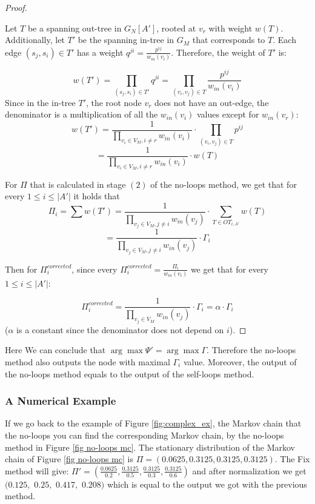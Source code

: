 \documentclass[sigconf,anonymous]{aamas}
\begin{document}
\begin{proof}
\begin{figure}[hbpt]
    \label{fig: no loop in-tree out-tree}
\end{figure}




Let $T$ be a spanning out-tree in $G_N[A']$, rooted at $v_r$ with weight $w(T)$. %
Additionally, let $T'$ be the spanning in-tree in $G_M$ that corresponds to $T$.
Each edge $(s_j,s_i) \in T'$ has a weight $q^{ji} = \frac{p^{ij}}{w_{in}(v_i)}$. 
Therefore, the weight of $T'$ is:

\[
w(T') = \prod _{(s_j,s_i)\in T'} q^{ji}
=\prod _{(v_i,v_j)\in T} \frac{p^{ij}}{w_{in}(v_i)} 
\]
Since in the in-tree $T'$, the root node $v_r$ does not have an out-edge, the denominator is a multiplication of all the $w_{in}(v_i)$ values except for $w_{in}(v_r)$:
\[
w(T') =\frac{1}{\prod _{v_i\in V_M , i\neq r} w_{in}(v_i)} \cdot \prod _{(v_i,v_j)\in T} p^{ij}
\]
\[
=\frac{1}{\prod _{v_i\in V_M , i\neq r} w_{in}(v_i)} \cdot w(T)
\]

For $\Pi$ that is calculated in stage $(2)$ of the no-loops method, we get that for every $1\leq i\leq |A'|$ it holds that \[
\Pi_i = \sum w(T') = \frac{1}{\prod _{v_j\in V_M , j\neq i} w_{in}(v_j)} \cdot \sum_{T\in OT_{i,A'}}w(T)
\]
\[
= \frac{1}{\prod _{v_j\in V_M , j\neq i} w_{in}(v_j)} \cdot \Gamma_i
\]

Then for $\Pi^{corrected}_i$, since every $\Pi^{corrected}_i = \frac{\Pi_i}{w_{in}(v_i)}$ we get that
for every $1\leq i \leq |A'|$: 

\[
\Pi^{corrected}_i= \frac{1}{\prod _{v_j\in V_M } w_{in}(v_j)} \cdot \Gamma_i
= \alpha \cdot \Gamma_i
\]
($\alpha$ is a constant since the denominator does not depend on $i$). 
\end{proof}



Here We can conclude that $\arg \max \Psi' = \arg \max \Gamma$. Therefore the no-loops method also outputs the node with maximal $\Gamma_i$ value. Moreover, the output of the no-loops method equals to the output of the self-loops method.


\subsubsection{A Numerical Example}
If we go back to the example of Figure \ref{fig:complex_ex}, 
the Markov chain that the no-loops
you can find the corresponding Markov chain, by the no-loops method in Figure \ref{fig no-loops mc}.
The stationary distribution of the Markov chain of Figure \ref{fig no-loops mc} is $\Pi=(0.0625,0.3125,0.3125,0.3125)$.
The Fix method will give:
$\Pi'=(\frac{0.0625}{0.2},\frac{0.3125}{0.5},\frac{0.3125}{0.3},\frac{0.3125}{0.6})$ 
and after normalization we get 
$(0.125,$ $0.25,$ $0.417,$ $0.208)$
which is equal to the output we got with the previous method.
\end{document}
